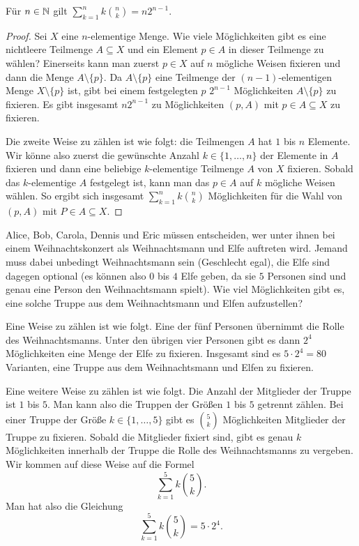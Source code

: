 \begin{prop} \label{doppeltes:abzaehlen} 
	Für $n \in \mathbb{N}$ gilt $\sum_{k=1}^n k \binom{n}{k} = n 2^{n-1}.$ 
\end{prop} 
\begin{proof}
	Sei $X$ eine $n$-elementige Menge. Wie viele Möglichkeiten gibt es eine nichtleere Teilmenge $A \subseteq X$ und ein Element $p \in A$ in dieser Teilmenge zu wählen? Einerseits kann man zuerst $p \in X$ auf $n$ mögliche Weisen fixieren und dann die Menge $A \setminus \{p\}$. Da $A \setminus \{p\}$ eine Teilmenge der $(n-1)$-elementigen Menge $X \setminus \{p\}$ ist, gibt bei einem festgelegten $p$ $2^{n-1}$ Möglichkeiten $A \setminus \{p\}$ zu fixieren. Es gibt insgesamt $n 2^{n-1}$ zu Möglichkeiten $(p,A)$ mit $p \in A \subseteq X$ zu fixieren. 
	
	Die zweite Weise zu zählen ist wie folgt: die Teilmengen $A$ hat $1$ bis $n$ Elemente. Wir könne also zuerst die gewünschte Anzahl $k \in \{1,\ldots,n\}$ der Elemente in $A$ fixieren und dann eine beliebige $k$-elementige Teilmenge $A$ von $X$ fixieren. Sobald das $k$-elementige $A$ festgelegt ist, kann man das $p \in A$ auf $k$ mögliche Weisen wählen. So ergibt sich insgesamt $\sum_{k=1}^n k \binom{n}{k}$ Möglichkeiten für die Wahl von $(p, A)$ mit $P \in A \subseteq X$. 
\end{proof} 

\begin{bsp}
	Alice, Bob, Carola, Dennis und Eric müssen entscheiden, wer unter ihnen bei einem Weihnachtskonzert als Weihnachtsmann und Elfe auftreten wird.  Jemand  muss dabei unbedingt Weihnachtsmann sein (Geschlecht egal), die Elfe sind dagegen optional (es können also $0$ bis $4$ Elfe geben, da sie $5$ Personen sind und genau eine Person den Weihnachtsmann spielt). Wie viel Möglichkeiten gibt es, eine solche Truppe aus dem Weihnachtsmann und Elfen  aufzustellen?  
	
	Eine Weise zu zählen ist wie folgt. Eine der fünf Personen übernimmt die Rolle des Weihnachtsmanns. Unter den übrigen vier Personen gibt es dann $2^4$ Möglichkeiten eine Menge der Elfe zu fixieren. Insgesamt sind es $5 \cdot 2^4 = 80$ Varianten, eine Truppe aus dem Weihnachtsmann und Elfen zu fixieren. 
	
	Eine weitere Weise zu zählen ist wie folgt. Die Anzahl der Mitglieder der Truppe ist $1$ bis $5$. Man kann also die Truppen der Größen $1$ bis $5$ getrennt zählen. Bei einer Truppe der Größe $k \in \{1,\ldots,5\}$ gibt es $\binom{5}{k}$ Möglichkeiten Mitglieder der Truppe zu fixieren. Sobald die Mitglieder fixiert sind, gibt es genau $k$ Möglichkeiten innerhalb der Truppe die Rolle des Weihnachtsmanns zu vergeben. Wir kommen auf diese Weise auf  die Formel
	\[
			\sum_{k=1}^5 k \binom{5}{k}. 
	\]
	Man hat also die Gleichung 
	\[
			\sum_{k=1}^5 k \binom{5}{k} = 5 \cdot 2^4.
	\]
\end{bsp} 

